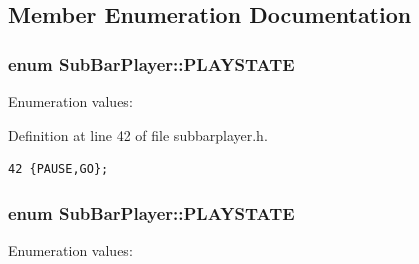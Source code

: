 \subsection{Member Enumeration Documentation}
\subsubsection{\setlength{\rightskip}{0pt plus 5cm}enum {\bf Sub\-Bar\-Player::PLAYSTATE}\hspace{0.3cm}{\tt  [private]}}\label{classSubBarPlayer_SubBarPlayery3}


\begin{Desc}
\item[Enumeration values: ]\par
\begin{description}
\item[{\em 
PAUSE\label{classSubBarPlayer_SubBarPlayery3SubBarPlayery0}
}]\item[{\em 
GO\label{classSubBarPlayer_SubBarPlayery3SubBarPlayery1}
}]\end{description}
\end{Desc}



Definition at line 42 of file subbarplayer.h.



\footnotesize\begin{verbatim}42 {PAUSE,GO};
\end{verbatim}\normalsize 
{}
\subsubsection{\setlength{\rightskip}{0pt plus 5cm}enum {\bf Sub\-Bar\-Player::PLAYSTATE}\hspace{0.3cm}{\tt  [private]}}\label{classSubBarPlayer_SubBarPlayery2}


\begin{Desc}
\item[Enumeration values: ]\par
\begin{description}
\item[{\em 
PAUSE\label{classSubBarPlayer_SubBarPlayery3SubBarPlayery0}
}]\item[{\em 
GO\label{classSubBarPlayer_SubBarPlayery3SubBarPlayery1}
}]\end{description}
\end{Desc}



